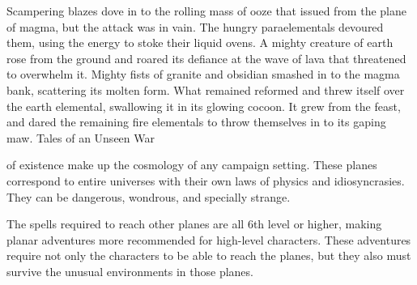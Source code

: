 {Scampering blazes dove in to the rolling mass of ooze that issued from the plane of magma, but the attack was in vain. The hungry paraelementals devoured them, using the energy to stoke their liquid ovens. A mighty creature of earth rose from the ground and roared its defiance at the wave of lava that threatened to overwhelm it. Mighty fists of granite and obsidian smashed in to the magma bank, scattering its molten form. What remained reformed and threw itself over the earth elemental, swallowing it in its glowing cocoon. It grew from the feast, and dared the remaining fire elementals to throw themselves in to its gaping maw.}
{Tales of an Unseen War}

 of existence make up the cosmology of any campaign setting. These planes correspond to entire universes with their own laws of physics and idiosyncrasies. They can be dangerous, wondrous, and specially strange.

The spells required to reach other planes are all 6th level or higher, making planar adventures more recommended for high-level characters. These adventures require not only the characters to be able to reach the planes, but they also must survive the unusual environments in those planes.









